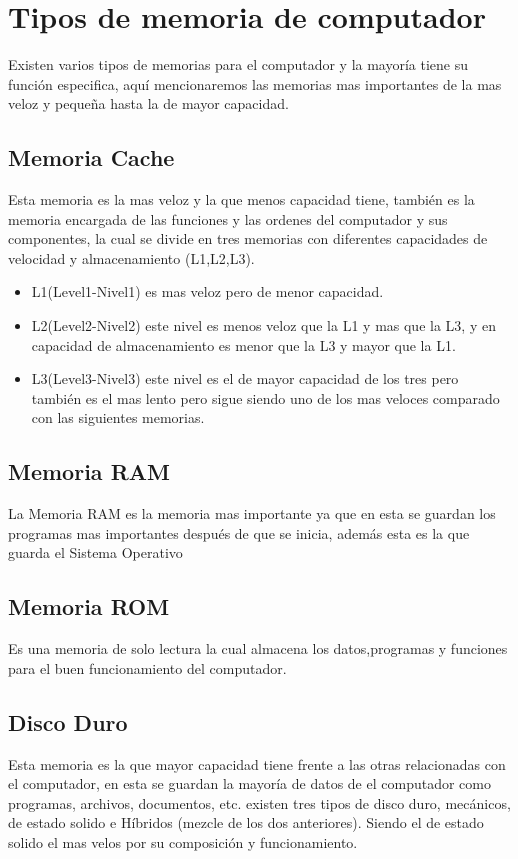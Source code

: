 \documentclass{article}
\begin{document}
	\section{Tipos de memoria de computador} \label{contenido}
	Existen varios tipos de memorias para el computador y la mayoría tiene su función especifica, aquí mencionaremos las memorias mas importantes de la mas veloz y pequeña hasta la de mayor capacidad.
	\subsection{Memoria Cache}
	Esta memoria es la mas veloz y la que menos capacidad tiene, también es la memoria encargada de las funciones y las ordenes del computador y sus componentes, la cual se divide en tres memorias con diferentes capacidades de velocidad y almacenamiento  (L1,L2,L3).
	\begin{itemize}
		\item{L1(Level1-Nivel1) es mas veloz pero de menor capacidad.}
		\item{L2(Level2-Nivel2) este nivel es menos veloz que la L1 y mas que la L3, y en capacidad de almacenamiento es menor que la L3 y mayor que la L1.}
		\item {L3(Level3-Nivel3) este nivel es el de mayor capacidad de los tres pero también es el mas lento pero sigue siendo uno de los mas veloces comparado con las siguientes memorias.}
	\end{itemize}
	
	\subsection{Memoria RAM}
	La Memoria RAM es la memoria mas importante ya que en esta se guardan los programas mas importantes después de que se inicia, además esta es la que guarda el Sistema Operativo
	
	\subsection{Memoria ROM}
	Es una memoria de solo lectura la cual almacena los datos,programas y funciones para el buen funcionamiento del computador. \cite{rom}
	
	\subsection{Disco Duro}
	Esta memoria es la que mayor capacidad tiene frente a las otras relacionadas con el computador, en esta se guardan la mayoría de datos de el computador como programas, archivos, documentos, etc. existen tres tipos de disco duro, mecánicos, de estado solido e Híbridos (mezcle de los dos anteriores). Siendo el de estado solido el mas velos por su composición y funcionamiento.
	
\end{document}
